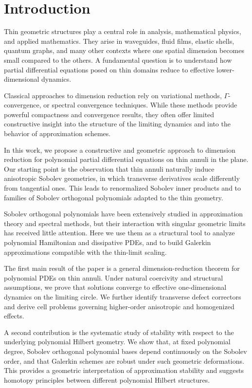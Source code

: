 \documentclass[11pt]{amsart}
\theoremstyle{plain}
\theoremstyle{definition}
\theoremstyle{remark}
\theoremstyle{remark}
\begin{document}
\tableofcontents

\section{Introduction}

Thin geometric structures play a central role in analysis, mathematical physics, and applied mathematics.
They arise in waveguides, fluid films, elastic shells, quantum graphs, and many other contexts where one spatial dimension becomes small compared to the others.
A fundamental question is to understand how partial differential equations posed on thin domains reduce to effective lower-dimensional dynamics.

Classical approaches to dimension reduction rely on variational methods, $\Gamma$-convergence, or spectral convergence techniques.
While these methods provide powerful compactness and convergence results, they often offer limited constructive insight into the structure of the limiting dynamics and into the behavior of approximation schemes.

In this work, we propose a constructive and geometric approach to dimension reduction for polynomial partial differential equations on thin annuli in the plane.
Our starting point is the observation that thin annuli naturally induce anisotropic Sobolev geometries, in which transverse derivatives scale differently from tangential ones.
This leads to renormalized Sobolev inner products and to families of Sobolev orthogonal polynomials adapted to the thin geometry.

Sobolev orthogonal polynomials have been extensively studied in approximation theory and spectral methods, but their interaction with singular geometric limits has received little attention.
Here we use them as a structural tool to analyze polynomial Hamiltonian and dissipative PDEs, and to build Galerkin approximations compatible with the thin-limit scaling.

The first main result of the paper is a general dimension-reduction theorem for polynomial PDEs on thin annuli.
Under natural coercivity and structural assumptions, we prove that solutions converge to effective one-dimensional dynamics on the limiting circle.
We further identify transverse defect correctors and derive cell problems governing higher-order anisotropic and homogenized effects.

A second contribution is the systematic study of stability with respect to the underlying polynomial Hilbert geometry.
We show that, at fixed polynomial degree, Sobolev orthogonal polynomial bases depend continuously on the Sobolev order, and that Galerkin schemes are robust under such geometric deformations.
This provides a geometric interpretation of approximation stability and suggests homotopy principles between different polynomial Hilbert structures.
\end{document}
